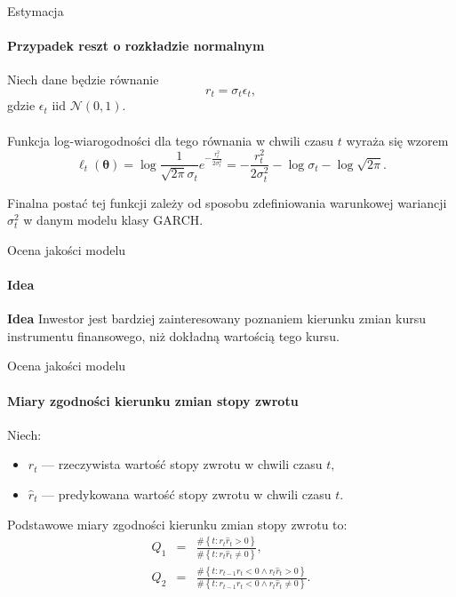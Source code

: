 \documentclass[a4paper, 11pt]{beamer}
\begin{document}
	\begin{frame}{Estymacja}
		\framesubtitle{Przypadek reszt o rozkładzie normalnym}
		
		Niech dane będzie równanie \[
			r_t = \sigma_t \epsilon_t,
		\] gdzie $\epsilon_t \mbox{ iid } \mathcal{N}\left(0, 1\right).$
		\\~\\
		Funkcja log-wiarogodności dla tego równania w chwili czasu $t$ wyraża się
		wzorem \[
			\ell_t\left(\boldsymbol{\theta}\right) = 
				\log \frac{1}{\sqrt{2\pi}\sigma_t} e^{-\frac{r_t^2}{2\sigma_t^2}} = 
				-\frac{r_t^2}{2\sigma_t^2} - \log \sigma_t - \log \sqrt{2\pi}.
		\]
		
		Finalna postać tej funkcji zależy od sposobu zdefiniowania
		warunkowej wariancji $\sigma_t^2$ w danym modelu klasy GARCH.
	\end{frame}
	
	\begin{frame}{Ocena jakości modelu}
		\framesubtitle{Idea}
		\begin{block}{\textbf{Idea}}
			Inwestor jest bardziej zainteresowany poznaniem kierunku zmian kursu
			instrumentu finansowego, niż dokładną wartością tego kursu.
		\end{block}
	\end{frame}
	
	\begin{frame}{Ocena jakości modelu}
		\framesubtitle{Miary zgodności kierunku zmian stopy zwrotu}
		Niech:
		\begin{itemize}
			\item $r_t$ --- rzeczywista wartość stopy zwrotu w chwili czasu $t,$
			\item $\hat{r}_t$ --- predykowana wartość stopy zwrotu w chwili czasu $t.$
		\end{itemize}
		Podstawowe miary zgodności kierunku zmian stopy zwrotu to:
		\begin{eqnarray*}
			Q_1 & = & \frac{
				\#\left\{t: r_t \hat{r}_t > 0\right\}
			}{
				\#\left\{t: r_t \hat{r}_t \neq 0\right\}
			},\\
			Q_2 & = & \frac{
				\#\left\{t: r_{t-1} r_t < 0 \wedge r_t \hat{r}_t > 0\right\}
			}{
				\#\left\{t: r_{t-1} r_t < 0 \wedge r_t \hat{r}_t \neq 0\right\}
			}.
		\end{eqnarray*}
	\end{frame}
	
\end{document}
